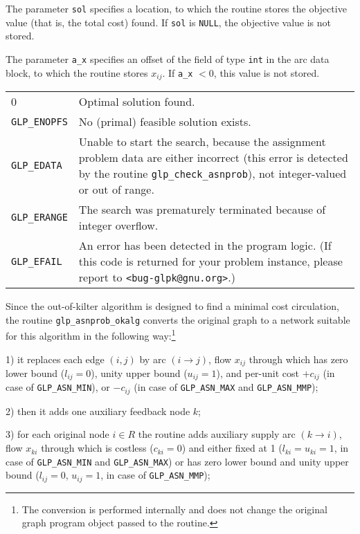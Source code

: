 \documentclass[11pt]{report}
\makeatletter
\def\para#1{\noindent{\bf#1}}
\def\returns{\para{Returns}}
\newenvironment{retlist}
{  \def\arraystretch{1.5}
   \noindent
   \begin{tabular}{@{}p{1in}@{}p{5.5in}@{}}
}
{\end{tabular}}
\makeatother
\begin{document}
The parameter \verb|sol| specifies a location, to which the routine
stores the objective value (that is, the total cost) found.
If \verb|sol| is \verb|NULL|, the objective value is not stored.

The parameter \verb|a_x| specifies an offset of the field of type
\verb|int| in the arc data block, to which the routine stores $x_{ij}$.
If \verb|a_x| $<0$, this value is not stored.

\returns

\begin{retlist}
0 & Optimal solution found.\\

\verb|GLP_ENOPFS| & No (primal) feasible solution exists.\\

\verb|GLP_EDATA| & Unable to start the search, because the assignment
problem data are either incorrect (this error is detected by the
routine \verb|glp_check_asnprob|), not integer-valued or out of range.\\

\verb|GLP_ERANGE| & The search was prematurely terminated because of
integer overflow.\\

\verb|GLP_EFAIL| & An error has been detected in the program logic.
(If this code is returned for your problem instance, please report to
\verb|<bug-glpk@gnu.org>|.)\\
\end{retlist}

\newpage

\para{Comments}

Since the out-of-kilter algorithm is designed to find a minimal cost
circulation, the routine \verb|glp_asnprob_okalg| converts the original
graph to a network suitable for this algorithm in the following
way:\footnote{The conversion is performed internally and does not
change the original graph program object passed to the routine.}

1) it replaces each edge $(i,j)$ by arc $(i\rightarrow j)$,
flow $x_{ij}$ through which has zero lower bound ($l_{ij}=0$), unity
upper bound ($u_{ij}=1$), and per-unit cost $+c_{ij}$ (in case of
\verb|GLP_ASN_MIN|), or $-c_{ij}$ (in case of \verb|GLP_ASN_MAX| and
\verb|GLP_ASN_MMP|);

2) then it adds one auxiliary feedback node $k$;

3) for each original node $i\in R$ the routine adds auxiliary supply
arc $(k\rightarrow i)$, flow $x_{ki}$ through which is costless
($c_{ki}=0$) and either fixed at 1 ($l_{ki}=u_{ki}=1$, in case of
\verb|GLP_ASN_MIN| and \verb|GLP_ASN_MAX|) or has zero lower bound and
unity upper bound ($l_{ij}=0$, $u_{ij}=1$, in case of
\verb|GLP_ASN_MMP|);
\end{document}

